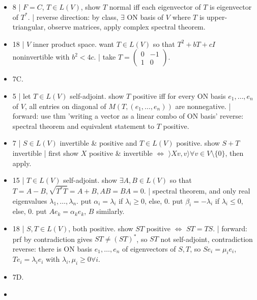 \begin{itemize}
	\item 8 | $F=C$, $T \in L(V)$, show $T$ normal iff each eigenvector of $T$ is eigenvector of $T^*$. | reverse direction: by class, $\exists$ ON basis of $V$ where $T$ is upper-triangular, observe matrices, apply complex spectral theorem. 
	\item 18 | $V$ inner product space. want $T \in L(V)$ so that $T^2 + bT + cI$ noninvertible with $b^2 < 4c$. | take $T = \begin{pmatrix} 0 & -1 \\ 1 & 0 \end{pmatrix}$. 
	\item 7C. 
	\item 5 | let $T \in L(V)$ self-adjoint. show $T$ positive iff for every ON basis $e_1,\dots,e_n$ of $V$, all entries on diagonal of $M(T,(e_1,\dots,e_n))$ are nonnegative. | forward: use thm 'writing a vector as a linear combo of ON basis' reverse: spectral theorem and equivalent statement to $T$ positive. 
	\item 7 | $S \in L(V)$ invertible \& positive and $T \in L(V)$ positive. show $S+T$ invertible | first show $X$ positive \& invertible $\iff$ $\rangle Xv,v \rangle \forall v \in V \setminus \{0\}$, then apply. 
	\item 15 | $T \in L(V)$ self-adjoint. show $\exists A,B \in L(V)$ so that $T=A-B, \sqrt{T^*T} = A+B, AB=BA=0$. | spectral theorem, and only real eigenvalues $\lambda_1,\dots,\lambda_n$. put $\alpha_i = \lambda_i$ if $\lambda_i \geq 0$, else, 0. put $\beta_i = -\lambda_i$ if $\lambda_i \leq 0$, else, 0. put $Ae_k = \alpha_ke_k$, $B$ similarly. 
	\item 18 | $S,T \in L(V)$, both positive. show $ST$ positive $\iff$ $ST=TS$. | forward: prf by contradiction gives $ST \neq (ST)^*$, so $ST$ not self-adjoint, contradiction reverse: there is ON basis $e_1,\dots,e_n$ of eigenvectors of $S,T$, so $Se_i = \mu_ie_i$, $Te_i = \lambda_ie_i$ with $\lambda_i,\mu_i \geq 0 \forall i$. 
	\item 7D. 
	\item 
\end{itemize}


